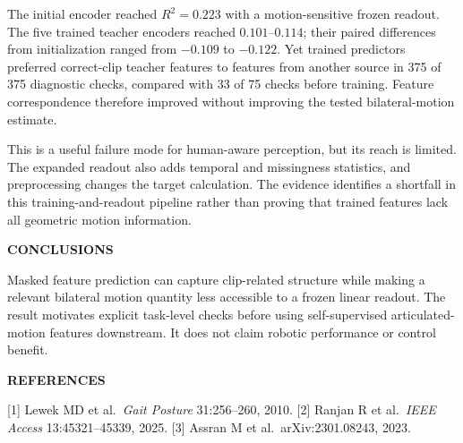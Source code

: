 \documentclass[11pt,letterpaper]{article}
\renewcommand{\subsection}[1]{\vspace{2pt}\noindent\textbf{#1}\par\vspace{1pt}}
\begin{document}
The initial encoder reached \(R^2=0.223\) with a motion-sensitive frozen
readout. The five trained teacher encoders reached \(0.101\)--\(0.114\);
their paired differences from initialization ranged from \(-0.109\) to
\(-0.122\). Yet trained predictors preferred correct-clip teacher
features to features from another source in 375 of 375 diagnostic
checks, compared with 33 of 75 checks before training. Feature
correspondence therefore improved without improving the tested
bilateral-motion estimate.

This is a useful failure mode for human-aware perception, but its reach
is limited. The expanded readout also adds temporal and missingness
statistics, and preprocessing changes the target calculation. The
evidence identifies a shortfall in this training-and-readout pipeline
rather than proving that trained features lack all geometric motion
information.

\subsection{CONCLUSIONS}\label{conclusions}

Masked feature prediction can capture clip-related structure while
making a relevant bilateral motion quantity less accessible to a frozen
linear readout. The result motivates explicit task-level checks before
using self-supervised articulated-motion features downstream. It does
not claim robotic performance or control benefit.

\subsection{REFERENCES}\label{references}

{[}1{]} Lewek MD et al.~\emph{Gait Posture} 31:256--260, 2010. {[}2{]}
Ranjan R et al.~\emph{IEEE Access} 13:45321--45339, 2025. {[}3{]} Assran
M et al.~arXiv:2301.08243, 2023.
\end{document}
